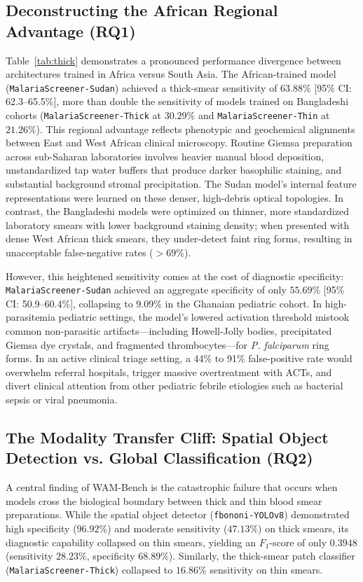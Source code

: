 \documentclass[a4paper,11pt]{article}
\begin{document}
\subsection{Deconstructing the African Regional Advantage (RQ1)}
Table~\ref{tab:thick} demonstrates a pronounced performance divergence between architectures trained in Africa versus South Asia. The African-trained model (\texttt{MalariaScreener-Sudan}) achieved a thick-smear sensitivity of $63.88\%$ [95\% CI: 62.3--65.5\%], more than double the sensitivity of models trained on Bangladeshi cohorts (\texttt{MalariaScreener-Thick} at $30.29\%$ and \texttt{MalariaScreener-Thin} at $21.26\%$). This regional advantage reflects phenotypic and geochemical alignments between East and West African clinical microscopy. Routine Giemsa preparation across sub-Saharan laboratories involves heavier manual blood deposition, unstandardized tap water buffers that produce darker basophilic staining, and substantial background stromal precipitation. The Sudan model's internal feature representations were learned on these denser, high-debris optical topologies. In contrast, the Bangladeshi models were optimized on thinner, more standardized laboratory smears with lower background staining density; when presented with dense West African thick smears, they under-detect faint ring forms, resulting in unacceptable false-negative rates ($>69\%$).

However, this heightened sensitivity comes at the cost of diagnostic specificity: \texttt{MalariaScreener-Sudan} achieved an aggregate specificity of only $55.69\%$ [95\% CI: 50.9--60.4\%], collapsing to $9.09\%$ in the Ghanaian pediatric cohort. In high-parasitemia pediatric settings, the model's lowered activation threshold mistook common non-parasitic artifacts---including Howell-Jolly bodies, precipitated Giemsa dye crystals, and fragmented thrombocytes---for \textit{P. falciparum} ring forms. In an active clinical triage setting, a 44\% to 91\% false-positive rate would overwhelm referral hospitals, trigger massive overtreatment with ACTs, and divert clinical attention from other pediatric febrile etiologies such as bacterial sepsis or viral pneumonia.

\subsection{The Modality Transfer Cliff: Spatial Object Detection vs. Global Classification (RQ2)}
A central finding of WAM-Bench is the catastrophic failure that occurs when models cross the biological boundary between thick and thin blood smear preparations. While the spatial object detector (\texttt{fbononi-YOLOv8}) demonstrated high specificity ($96.92\%$) and moderate sensitivity ($47.13\%$) on thick smears, its diagnostic capability collapsed on thin smears, yielding an $F_1$-score of only $0.3948$ (sensitivity $28.23\%$, specificity $68.89\%$). Similarly, the thick-smear patch classifier (\texttt{MalariaScreener-Thick}) collapsed to $16.86\%$ sensitivity on thin smears.
\end{document}
